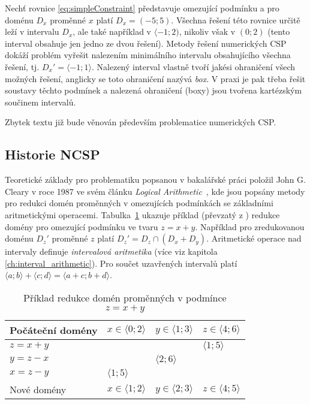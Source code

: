 Nechť rovnice \ref{eq:simpleConstraint} představuje omezující podmínku a pro doménu $D_x$ proměnné $x$ platí $D_x = (-5;5)$. Všechna řešení této rovnice určitě leží v intervalu $D_x$, ale také například v $\langle -1;2)$, nikoliv však v $(0;2)$ (tento interval obsahuje jen jedno ze dvou řešení). Metody řešení numerických CSP dokáží problém vyřešit nalezením minimálního intervalu obsahujícího všechna řešení, tj. $D_x' = \langle -1;1\rangle$. Nalezený interval vlastně tvoří jakési ohraničení všech možných řešení, anglicky se toto ohraničení nazývá \emph{box}. V praxi je pak třeba řešit soustavy těchto podmínek a nalezená ohraničení (boxy) jsou tvořena kartézským součinem intervalů.

Zbytek textu již bude věnován především problematice numerických CSP.

\subsection{Historie NCSP}

Teoretické základy pro problematiku popsanou v bakalářské práci položil John G. Cleary v roce 1987 ve svém článku \emph{Logical Arithmetic}~\cite{cleary87}, kde jsou popsány metody pro redukci domén proměnných v omezujících podmínkách se základními aritmetickými operacemi. Tabulka~\ref{narrowingTable} ukazuje příklad (převzatý z \cite{cleary87}) redukce domény pro omezující podmínku ve tvaru $z = x + y$. Například pro zredukovanou doménu $D_z'$ proměnné $z$ platí $D_z' = D_z \cap (D_x + D_y)$. Aritmetické operace nad intervaly definuje \emph{intervalová aritmetika} (více viz kapitola \ref{ch:interval_arithmetic}). Pro součet uzavřených intervalů platí $\langle a;b \rangle + \langle c;d \rangle = \langle a + c ; b + d \rangle$.

\begin{table}[ht]
\centering
\label{narrowingTable}
\begin{tabular}{|l|l|l|l|}
\hline
 Počáteční domény & $x \in \langle 0;2 \rangle$ & $y \in \langle 1;3 \rangle$ & $z \in \langle 4;6 \rangle$  \\ \hline
 $z = x+y$  &  & &  $\langle 1;5 \rangle$  \\ \hline
 $y = z-x$  & & $\langle 2;6 \rangle$  &  \\ \hline
 $x = z-y$  & $\langle 1;5 \rangle$  &  &  \\ \hline
 Nové domény & $x \in \langle 1;2 \rangle$ & $y \in \langle 2;3 \rangle$ & $z \in \langle 4;5 \rangle$ \\ \hline
\end{tabular}
\caption{Příklad redukce domén proměnných v podmínce $z = x + y$}
\end{table}

